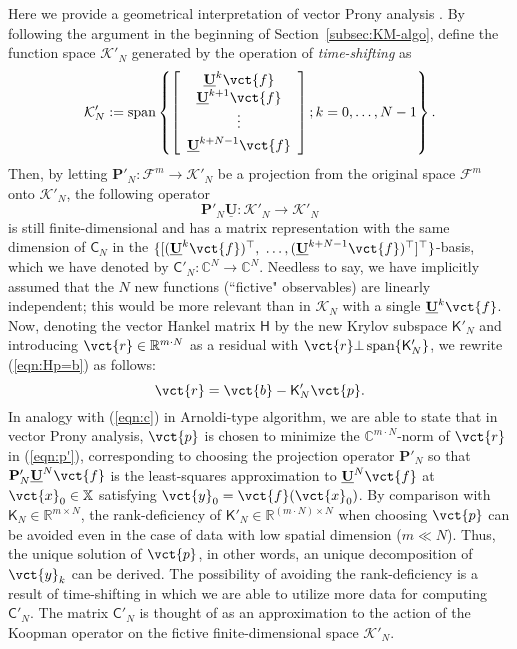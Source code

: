 \documentclass[a4paper,10pt]{article}
\def\bP{{\mathbf{P}}}
\def\bbR{{\mathbb{R}}}
\def\bbC{{\mathbb{C}}}
\def\cF{{\mathcal{F}}}
\begin{document}
%
Here we provide a geometrical interpretation of vector Prony analysis \cite{Raak_CDC16}.  
By following the argument in the beginning of Section~\ref{subsec:KM-algo}, define the function space $\mathcal{K}'_N$ generated by the operation of \emph{time-shifting} as
\[
\mathcal{K}'_N:=\mathrm{span}\left\{
\left[
\begin{array}{c}
\mathbf{\underline{U}}^k\vct{f} \\ \mathbf{\underline{U}}^{k+1}\vct{f} \\ \vdots \\\noalign{\vskip 1mm}
\mathbf{\underline{U}}^{k+N-1}\vct{f}
\end{array}
\right]; k=0,\ldots,N-1
\right\}.
\]
Then, by letting $\bP'_N:\cF^m\to\mathcal{K}'_N$ be a projection from the original space $\cF^m$ onto $\mathcal{K}'_N$, the following operator
\[
\bP'_N\mathbf{\underline{U}}: \mathcal{K}'_N\to\mathcal{K}'_N
\]
is still finite-dimensional and has a matrix representation with the same dimension of $\mathsf{C}_N$ in the $\{[(\mathbf{\underline{U}}^k\vct{f})^\top,$ $\ldots,(\mathbf{\underline{U}}^{k+N-1}\vct{f})^\top]^\top\}$-basis, which we have denoted by $\mathsf{C}'_N:\bbC^N\to\bbC^N$.  
Needless to say, we have implicitly assumed that the $N$ new functions (``fictive" observables) are linearly independent; this would be more relevant than in $\mathcal{K}_N$ with a single $\mathbf{\underline{U}}^k\vct{f}$.  
Now, denoting the vector Hankel matrix $\mathsf{H}$ by the new Krylov subspace $\mathsf{K}'_{N}$ and introducing $\vct{r}\in\bbR^{m\cdot N}$ as a residual with $\vct{r}\bot\,\mathrm{span}\{\mathsf{K}'_{N}\}$, we rewrite (\ref{eqn:Hp=b}) as follows:
\begin{equation}
\vct{r}=\vct{b}-\mathsf{K}'_N\vct{p}.
\label{eqn:p'}
\end{equation}
In analogy with (\ref{eqn:c}) in Arnoldi-type algorithm, we are able to state that in vector Prony analysis, $\vct{p}$ is chosen to minimize the $\bbC^{m\cdot N}$-norm of $\vct{r}$ in (\ref{eqn:p'}), corresponding to choosing the projection operator $\mathbf{P}'_{N}$ so that $\mathbf{P}'_{N}\mathbf{\underline{U}}^{N}\vct{f}$ is the least-squares approximation to $\mathbf{\underline{U}}^{N}\vct{f}$ at $\vct{x}_0\in\mathbb{X}$ satisfying $\vct{y}_0=\vct{f}(\vct{x}_0)$.   
By comparison with $\mathsf{K}_N\in\bbR^{m\times N}$, the rank-deficiency of $\mathsf{K}'_{N}\in\bbR^{(m\cdot N)\times N}$ when choosing $\vct{p}$ can be avoided even in the case of data with low spatial dimension ($m\ll N$).  
Thus, the unique solution of $\vct{p}$, in other words, an unique decomposition of $\vct{y}_k$ can be derived.  
The possibility of avoiding the rank-deficiency is a result of time-shifting in which we are able to utilize more data for computing $\mathsf{C}'_N$.  
The matrix $\mathsf{C}'_N$ is thought of as an approximation to the action of the Koopman operator on the fictive finite-dimensional space $\mathcal{K}'_N$.  
\end{document}
